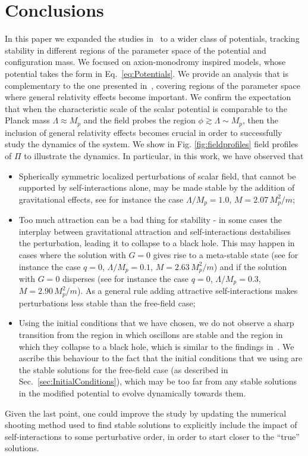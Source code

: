 \documentclass[11pt,a4paper]{article}
\begin{document}
\section{Conclusions}
\label{sec:Conclusions}

In this paper we expanded the studies in~\cite{1906.09346} to a wider class of potentials, tracking stability in different regions of the parameter space of the potential and configuration mass. We focused on axion-monodromy inspired models, whose potential takes the form in Eq.~\eqref{eq:Potentials}. We provide an analysis that is complementary to the one presented in~\cite{Zhang:2020bec}, covering regions of the parameter space where general relativity effects become important. We confirm the expectation that when the characteristic scale of the scalar potential is comparable to the Planck mass $\Lambda \approx M_p$ and the field probes the region $\phi \gtrsim \Lambda \sim M_p$, then the inclusion of general relativity effects becomes crucial in order to successfully study the dynamics of the system. We show in Fig. \ref{fig:fieldprofiles} field profiles of $\Pi$ to illustrate the dynamics. In particular, in this work, we have observed that
\begin{itemize}
    \item Spherically symmetric localized perturbations of scalar field, that cannot be supported by self-interactions alone, may be made stable by the addition of gravitational effects, see for instance the case $\Lambda/M_p = 1.0$, $M = 2.07 \, M_p^2/m$;
    \item Too much attraction can be a bad thing for stability - in some cases the interplay between gravitational attraction and self-interactions destabilises the perturbation, leading it to collapse to a black hole. This may happen in cases where the solution with $G=0$ gives rise to a meta-stable state (see for instance the case $q=0$, $\Lambda/M_p=0.1$, $M = 2.63 \, M_p^2/m$) and if the solution with $G=0$ disperses (see for instance the case $q=0$, $\Lambda/M_p = 0.3$, $M = 2.90 \, M_p^2/m$). As a general rule adding attractive self-interactions makes perturbations less stable than the free-field case;
    \item Using the initial conditions that we have chosen, we do not observe a sharp transition from the region in which oscillons are stable and the region in which they collapse to a black hole, which is similar to the findings in~\cite{Michel:2018nzt}. We ascribe this behaviour to the fact that the initial conditions that we using are the stable solutions for the free-field case (as described in Sec.~\ref{sec:InitialConditions}), which may be too far from any stable solutions in the modified potential to evolve dynamically towards them.
\end{itemize}
Given the last point, one could improve the study by updating the numerical shooting method used to find stable solutions to explicitly include the impact of self-interactions to some perturbative order, in order to start closer to the ``true'' solutions.
 
\end{document}
